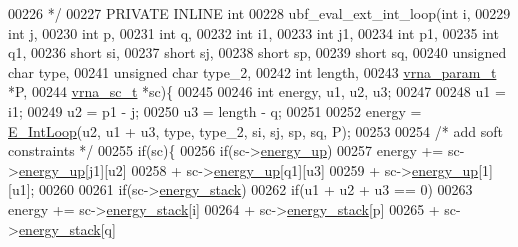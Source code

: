 \begin{DoxyCode}
00226 \textcolor{comment}{ */}
00227 PRIVATE INLINE \textcolor{keywordtype}{int}
00228 ubf\_eval\_ext\_int\_loop(\textcolor{keywordtype}{int} i,
00229                       \textcolor{keywordtype}{int} j,
00230                       \textcolor{keywordtype}{int} p,
00231                       \textcolor{keywordtype}{int} q,
00232                       \textcolor{keywordtype}{int} i1,
00233                       \textcolor{keywordtype}{int} j1,
00234                       \textcolor{keywordtype}{int} p1,
00235                       \textcolor{keywordtype}{int} q1,
00236                       \textcolor{keywordtype}{short} si,
00237                       \textcolor{keywordtype}{short} sj,
00238                       \textcolor{keywordtype}{short} sp,
00239                       \textcolor{keywordtype}{short} sq,
00240                       \textcolor{keywordtype}{unsigned} \textcolor{keywordtype}{char} type,
00241                       \textcolor{keywordtype}{unsigned} \textcolor{keywordtype}{char} type\_2,
00242                       \textcolor{keywordtype}{int} length,
00243                       \hyperlink{group__energy__parameters_structvrna__param__s}{vrna\_param\_t} *P,
00244                       \hyperlink{group__soft__constraints_structvrna__sc__s}{vrna\_sc\_t} *sc)\{
00245 
00246   \textcolor{keywordtype}{int} energy, u1, u2, u3;
00247   
00248   u1 = i1;
00249   u2 = p1 - j;
00250   u3 = length - q;
00251 
00252   energy = \hyperlink{group__loops_ga0266d2c7a6098259280fb97e9f980b34}{E\_IntLoop}(u2, u1 + u3, type, type\_2, si, sj, sp, sq, P);
00253 
00254   \textcolor{comment}{/* add soft constraints */}
00255   \textcolor{keywordflow}{if}(sc)\{
00256     \textcolor{keywordflow}{if}(sc->\hyperlink{group__soft__constraints_a57e4dbb924ab11f304e3762a3a9b07a1}{energy\_up})
00257       energy += sc->\hyperlink{group__soft__constraints_a57e4dbb924ab11f304e3762a3a9b07a1}{energy\_up}[j1][u2]
00258                 + sc->\hyperlink{group__soft__constraints_a57e4dbb924ab11f304e3762a3a9b07a1}{energy\_up}[q1][u3]
00259                 + sc->\hyperlink{group__soft__constraints_a57e4dbb924ab11f304e3762a3a9b07a1}{energy\_up}[1][u1];
00260 
00261     \textcolor{keywordflow}{if}(sc->\hyperlink{group__soft__constraints_ac20dded6068e81acd0f1139092f66a22}{energy\_stack})
00262       \textcolor{keywordflow}{if}(u1 + u2 + u3 == 0)
00263         energy +=   sc->\hyperlink{group__soft__constraints_ac20dded6068e81acd0f1139092f66a22}{energy\_stack}[i]
00264                   + sc->\hyperlink{group__soft__constraints_ac20dded6068e81acd0f1139092f66a22}{energy\_stack}[p]
00265                   + sc->\hyperlink{group__soft__constraints_ac20dded6068e81acd0f1139092f66a22}{energy\_stack}[q]

\end{DoxyCode}
